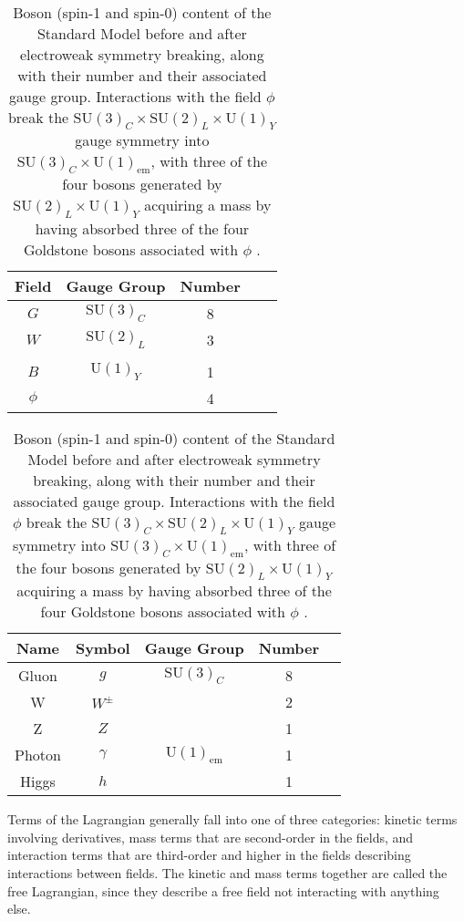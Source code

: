 \begin{table}[p]
  \centering
  \begin{tabular}{ccccc}
    \hline
    Field & Gauge Group & Number \\
    \hline
    $G$    & $\mathrm{SU}(3)_C$ & 8 \\
    $W$    & $\mathrm{SU}(2)_L$ & 3 \\
    & & & \\
    $B$    & $\mathrm{U}(1)_Y$  & 1 \\
    $\phi$ &                    & 4 \\
    \hline
  \end{tabular}
  \hspace{1em}
  \begin{tabular}{ccccc}
    \hline
    Name & Symbol & Gauge Group & Number \\
    \hline
    Gluon  & $g$      & $\mathrm{SU}(3)_C$           & 8 \\
    W      & $W^\pm$  &                              & 2 \\
    Z      & $Z$      &                              & 1 \\
    Photon & $\gamma$ & $\mathrm{U}(1)_\mathrm{em}$  & 1 \\
    Higgs  & $h$      &                              & 1 \\
    \hline
  \end{tabular}
  \caption[Boson (spin-1 and spin-0) content of the Standard Model.]{Boson (spin-1 and spin-0) content of the Standard Model  before and  after electroweak symmetry breaking, along with their number and their associated gauge group. Interactions with the field $\phi$ break the $\mathrm{SU}(3)_C\times\mathrm{SU}(2)_L\times\mathrm{U}(1)_Y$ gauge symmetry into $\mathrm{SU}(3)_C\times\mathrm{U}(1)_\mathrm{em}$, with three of the four bosons generated by $\mathrm{SU}(2)_L\times\mathrm{U}(1)_Y$ acquiring a mass by having absorbed three of the four Goldstone bosons associated with $\phi$ \cite{Griffiths, Srednicki, PDG:Higgs}.}
  \label{tab:sm:bosons}
\end{table}

Terms of the Lagrangian generally fall into one of three categories: kinetic terms involving derivatives, mass terms that are second-order in the fields, and interaction terms that are third-order and higher in the fields describing interactions between fields.
The kinetic and mass terms together are called the free Lagrangian, since they describe a free field not interacting with anything else.

